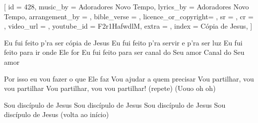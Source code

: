 [
    id                  = {428},
    music_by            = {Adoradores Novo Tempo},
    lyrics_by           = {Adoradores Novo Tempo},
    arrangement_by      = {},
    bible_verse         = {},
    licence_or_copyright= {},
    sr                  = {},
    cr                  = {},
    video_url           = {}, %
    youtube_id          = {F2r1HafwdlM},
    extra               = {},
    index               = {Cópia de Jesus},
]

\beginverse
Eu fui feito p’ra ser cópia de Jesus
Eu fui feito p’ra servir e p’ra ser luz
Eu fui feito para ir onde Ele for
Eu fui feito para ser canal do Seu amor 
Canal do Seu amor
\endverse

\beginchorus
Por isso eu vou fazer o que Ele faz
Vou ajudar a quem precisar
Vou partilhar, vou vou partilhar
Vou partilhar, vou vou partilhar! (repete)
(Uouo oh oh)
\endchorus

\beginchorus
Sou discípulo de Jesus 
Sou discípulo de Jesus 
Sou discípulo de Jesus 
Sou discípulo de Jesus
(volta ao início)
\endchorus


\endsong
